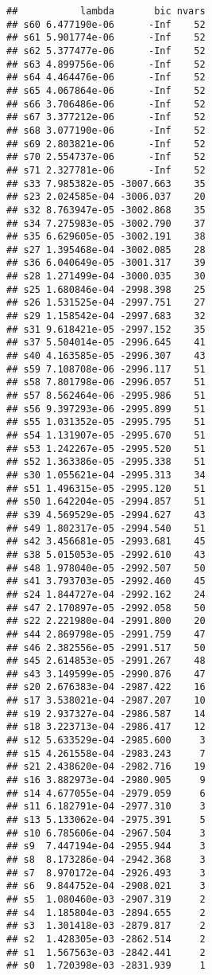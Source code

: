 \documentclass[
]{article}
\newenvironment{Shaded}{\begin{snugshade}}{\end{snugshade}}
\newcommand{\FunctionTok}[1]{\textcolor[rgb]{0.13,0.29,0.53}{\textbf{#1}}}
\newcommand{\NormalTok}[1]{#1}
\newcommand{\SpecialCharTok}[1]{\textcolor[rgb]{0.81,0.36,0.00}{\textbf{#1}}}
\begin{document}
\begin{Shaded}
\end{Shaded}

\begin{verbatim}
##           lambda       bic nvars
## s60 6.477190e-06      -Inf    52
## s61 5.901774e-06      -Inf    52
## s62 5.377477e-06      -Inf    52
## s63 4.899756e-06      -Inf    52
## s64 4.464476e-06      -Inf    52
## s65 4.067864e-06      -Inf    52
## s66 3.706486e-06      -Inf    52
## s67 3.377212e-06      -Inf    52
## s68 3.077190e-06      -Inf    52
## s69 2.803821e-06      -Inf    52
## s70 2.554737e-06      -Inf    52
## s71 2.327781e-06      -Inf    52
## s33 7.985382e-05 -3007.663    35
## s23 2.024585e-04 -3006.037    20
## s32 8.763947e-05 -3002.868    35
## s34 7.275983e-05 -3002.790    37
## s35 6.629605e-05 -3002.191    38
## s27 1.395468e-04 -3002.085    28
## s36 6.040649e-05 -3001.317    39
## s28 1.271499e-04 -3000.035    30
## s25 1.680846e-04 -2998.398    25
## s26 1.531525e-04 -2997.751    27
## s29 1.158542e-04 -2997.683    32
## s31 9.618421e-05 -2997.152    35
## s37 5.504014e-05 -2996.645    41
## s40 4.163585e-05 -2996.307    43
## s59 7.108708e-06 -2996.117    51
## s58 7.801798e-06 -2996.057    51
## s57 8.562464e-06 -2995.986    51
## s56 9.397293e-06 -2995.899    51
## s55 1.031352e-05 -2995.795    51
## s54 1.131907e-05 -2995.670    51
## s53 1.242267e-05 -2995.520    51
## s52 1.363386e-05 -2995.338    51
## s30 1.055621e-04 -2995.313    34
## s51 1.496315e-05 -2995.120    51
## s50 1.642204e-05 -2994.857    51
## s39 4.569529e-05 -2994.627    43
## s49 1.802317e-05 -2994.540    51
## s42 3.456681e-05 -2993.681    45
## s38 5.015053e-05 -2992.610    43
## s48 1.978040e-05 -2992.507    50
## s41 3.793703e-05 -2992.460    45
## s24 1.844727e-04 -2992.162    24
## s47 2.170897e-05 -2992.058    50
## s22 2.221980e-04 -2991.800    20
## s44 2.869798e-05 -2991.759    47
## s46 2.382556e-05 -2991.517    50
## s45 2.614853e-05 -2991.267    48
## s43 3.149599e-05 -2990.876    47
## s20 2.676383e-04 -2987.422    16
## s17 3.538021e-04 -2987.207    10
## s19 2.937327e-04 -2986.587    14
## s18 3.223713e-04 -2986.417    12
## s12 5.633529e-04 -2985.600     3
## s15 4.261558e-04 -2983.243     7
## s21 2.438620e-04 -2982.716    19
## s16 3.882973e-04 -2980.905     9
## s14 4.677055e-04 -2979.059     6
## s11 6.182791e-04 -2977.310     3
## s13 5.133062e-04 -2975.391     5
## s10 6.785606e-04 -2967.504     3
## s9  7.447194e-04 -2955.944     3
## s8  8.173286e-04 -2942.368     3
## s7  8.970172e-04 -2926.493     3
## s6  9.844752e-04 -2908.021     3
## s5  1.080460e-03 -2907.319     2
## s4  1.185804e-03 -2894.655     2
## s3  1.301418e-03 -2879.817     2
## s2  1.428305e-03 -2862.514     2
## s1  1.567563e-03 -2842.441     2
## s0  1.720398e-03 -2831.939     1
\end{verbatim}
\end{document}
